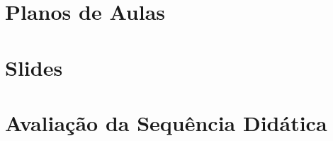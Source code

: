 \begin{apendicesenv}
	\chapter{Planos de Aulas} %
	\label{cha:Planos de Aulas}

	
	\newpage
	
	\newpage
	
	\newpage
	
	\newpage
	


	\chapter{Slides} %
	\label{chap:Slides}
	\newpage{
		\pagecolor{olive!15!white}
		
	}\pagecolor{white}

	\chapter{Avaliação da Sequência Didática} %
	\label{chap:Avaliação}
	
	

\end{apendicesenv}
